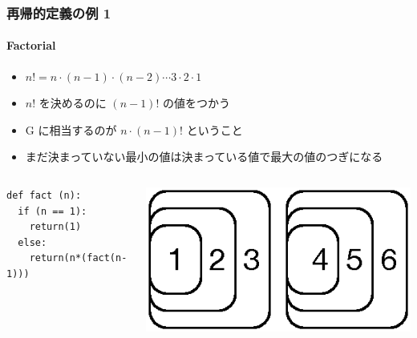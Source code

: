 \begin{frame}
\frametitle{再帰的定義の例 1}
\framesubtitle{Factorial}
  \begin{itemize}
\item \(n!=n\cdot(n-1)\cdot(n-2)\cdots 3\cdot 2\cdot 1\)
\item \(n!\) を決めるのに \((n-1)!\) の値をつかう
\item G に相当するのが \(n\cdot(n-1)!\) ということ
\item まだ決まっていない最小の値は決まっている値で最大の値のつぎになる
  \end{itemize}
  \begin{columns}[c]
    \begin{column}{0.5\textwidth}
      \begin{lstlisting}[caption={階乗},label=fact-rec]
def fact (n):
  if (n == 1):
    return(1)
  else:
    return(n*(fact(n-1)))
      \end{lstlisting}
    \end{column}
    \begin{column}{0.45\textwidth}
      \begin{example}[\(4!\)]
\includegraphics[scale=0.5]{./Figure/elementaryCS-2nd-figFact.eps}
      \end{example}
    \end{column}
  \end{columns}
\end{frame}
